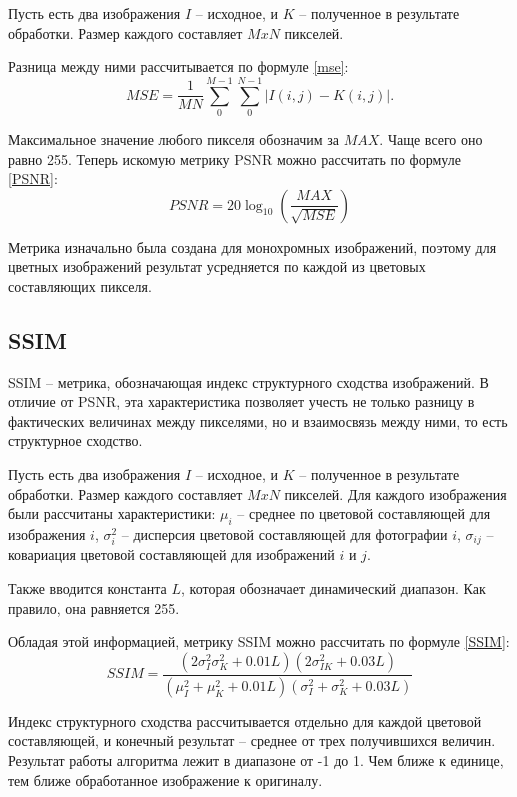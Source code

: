 Пусть есть два изображения $I$ -- исходное, и $K$ -- полученное в результате обработки.
Размер каждого составляет $MxN$ пикселей.

Разница между ними рассчитывается по формуле \ref{mse}:
\begin{equation}
	\label{mse}
	MSE = \frac{1}{MN}\sum_{0}^{M-1}\sum_{0}^{N-1}|I(i, j) - K(i, j)|.
\end{equation}

Максимальное значение любого пикселя обозначим за $MAX$. 
Чаще всего оно равно 255.
Теперь искомую метрику PSNR можно рассчитать по формуле \ref{PSNR}:
\begin{equation}
	\label{PSNR}
 	PSNR = 20\log_{10}(\frac{MAX}{\sqrt{MSE}})
\end{equation}

Метрика изначально была создана для монохромных изображений, поэтому для цветных изображений результат усредняется по каждой из цветовых составляющих пикселя.
 
\subsection{SSIM}
SSIM -- метрика, обозначающая индекс структурного сходства изображений. 
В отличие от PSNR, эта характеристика позволяет учесть не только разницу в фактических величинах между пикселями, но и взаимосвязь между ними, то есть структурное сходство.

Пусть есть два изображения $I$ -- исходное, и $K$ -- полученное в результате обработки.
Размер каждого составляет $MxN$ пикселей. 
Для каждого изображения были рассчитаны характеристики: $\mu_{i}$ -- среднее по цветовой составляющей для изображения $i$, $\sigma^2_i$ -- дисперсия цветовой составляющей для фотографии $i$, $\sigma_{ij}$ -- ковариация цветовой составляющей для изображений $i$ и $j$. 

Также вводится константа $L$, которая обозначает динамический диапазон. 
Как правило, она равняется 255. 

Обладая этой информацией, метрику SSIM можно рассчитать по формуле \ref{SSIM}:
\begin{equation}
	\label{SSIM}
	SSIM = \frac{(2\sigma^2_{I}\sigma^2_{K} + 0.01L)(2\sigma^2_{IK} + 0.03L)} { (\mu^2_{I}+\mu^2_{K} +0.01L)  (\sigma^2_{I} +\sigma^2_{K} +0.03L) }
\end{equation}

Индекс структурного сходства рассчитывается отдельно для каждой цветовой составляющей, и конечный результат -- среднее от трех получившихся величин.
Результат работы алгоритма лежит в диапазоне от -1 до 1. 
Чем ближе к единице, тем ближе обработанное изображение к оригиналу.

